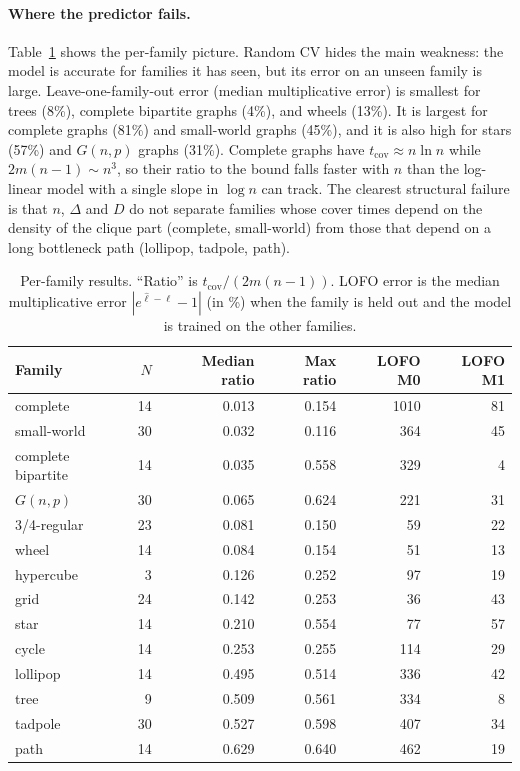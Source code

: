 \documentclass{article}
\begin{document}
\paragraph{Where the predictor fails.} Table~\ref{tab:fam} shows the per-family picture. Random CV hides the main weakness: the model is accurate for families it has seen, but its error on an unseen family is large. Leave-one-family-out error (median multiplicative error) is smallest for trees (8\%), complete bipartite graphs (4\%), and wheels (13\%). It is largest for complete graphs (81\%) and small-world graphs (45\%), and it is also high for stars (57\%) and $G(n,p)$ graphs (31\%). Complete graphs have $t_{\mathrm{cov}}\approx n\ln n$ while $2m(n-1)\sim n^3$, so their ratio to the bound falls faster with $n$ than the log-linear model with a single slope in $\log n$ can track. The clearest structural failure is that $n$, $\Delta$ and $D$ do not separate families whose cover times depend on the density of the clique part (complete, small-world) from those that depend on a long bottleneck path (lollipop, tadpole, path).

\begin{table}[t]
\caption{Per-family results. ``Ratio'' is $t_{\mathrm{cov}}/(2m(n-1))$. LOFO error is the median multiplicative error $|e^{\hat\ell-\ell}-1|$ (in \%) when the family is held out and the model is trained on the other families.}
\label{tab:fam}
\begin{center}
\begin{small}
\begin{tabular}{lrrrrr}
\toprule
Family & $N$ & Median ratio & Max ratio & LOFO M0 & LOFO M1 \\
\midrule
complete & 14 & 0.013 & 0.154 & 1010 & 81 \\
small-world & 30 & 0.032 & 0.116 & 364 & 45 \\
complete bipartite & 14 & 0.035 & 0.558 & 329 & 4 \\
$G(n,p)$ & 30 & 0.065 & 0.624 & 221 & 31 \\
3/4-regular & 23 & 0.081 & 0.150 & 59 & 22 \\
wheel & 14 & 0.084 & 0.154 & 51 & 13 \\
hypercube & 3 & 0.126 & 0.252 & 97 & 19 \\
grid & 24 & 0.142 & 0.253 & 36 & 43 \\
star & 14 & 0.210 & 0.554 & 77 & 57 \\
cycle & 14 & 0.253 & 0.255 & 114 & 29 \\
lollipop & 14 & 0.495 & 0.514 & 336 & 42 \\
tree & 9 & 0.509 & 0.561 & 334 & 8 \\
tadpole & 30 & 0.527 & 0.598 & 407 & 34 \\
path & 14 & 0.629 & 0.640 & 462 & 19 \\
\bottomrule
\end{tabular}
\end{small}
\end{center}
\vskip -0.1in
\end{table}
\end{document}
